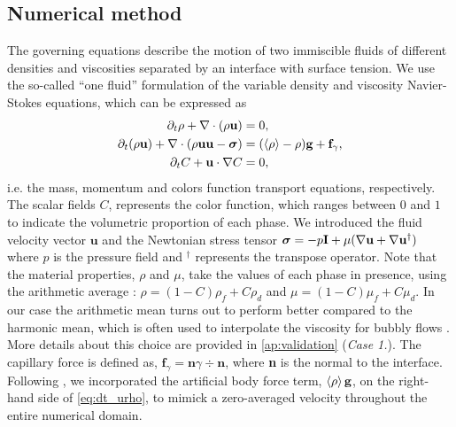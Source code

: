 \subsection{Numerical method}
The governing equations describe the motion of two immiscible fluids of different densities and viscosities separated by an interface with surface tension. 
We use the so-called ``one fluid'' formulation of the variable density and viscosity Navier-Stokes equations, which can be expressed as \citep{tryggvason2011direct}
\begin{align}
    \partial_t \rho+ \mathbf{\nabla}\cdot(\rho\textbf{u})
    &= 0,\\
    \label{eq:dt_urho}
    \partial_t (\rho \textbf{u})
    + \mathbf{\nabla}\cdot (\rho  \textbf{u} \textbf{u} - \bm\sigma)
    &= (\left<\rho\right> - \rho)\textbf{g}
    + \textbf{f}_\gamma,\\
    \label{eq:dt_C}
    \partial_t C + \textbf{u}\cdot\mathbf{\nabla} C  
    &= 0,
\end{align}
i.e. the mass, momentum and colors function transport equations, respectively. 
The scalar fields $C$, represents the color function, which ranges between $0$ and $1$ to indicate the volumetric proportion of each phase.
We introduced the fluid velocity vector $\textbf{u}$ and the Newtonian stress tensor $\bm{\sigma} = -p \textbf{I} + \mu (\mathbf{\nabla} \textbf{u}+ \mathbf{\nabla} \textbf{u}^\dagger)$ where $p$ is the pressure field and $^\dagger$ represents the transpose operator.
Note that the material properties, $\rho$ and $\mu$, take the values of each phase in presence, using the arithmetic average : $\rho = (1-C)\rho_f + C \rho_d$ and $\mu = (1-C)\mu_f + C \mu_d$. 
In our case the arithmetic mean turns out to perform better compared to the harmonic mean, which is often used to interpolate the viscosity for bubbly flows \citet{hidman2023assessing,innocenti2020direct}.
More details about this choice are provided in \ref{ap:validation} (\textit{Case 1.}). 
The capillary force is defined as, $\textbf{f}_\gamma =\textbf{n} \gamma \div \textbf{n} $, where \textbf{n} is the normal to the interface.
Following  \citep{bunner2002dynamics}, we incorporated the artificial body force term, $\left<\rho\right>\textbf{g}$, on the right-hand side of \ref{eq:dt_urho}, to mimick a zero-averaged velocity throughout the entire numerical domain.  

